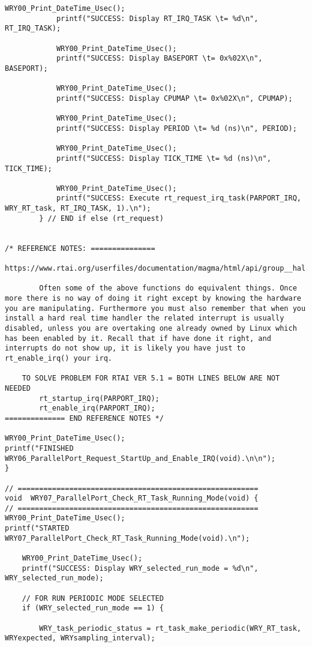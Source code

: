 \begin{lstlisting}[caption={App4-Full C-Code listing for Real Time (RTAI)}, label=App4-Full C-Code listing for Real Time (RTAI)]
			WRY00_Print_DateTime_Usec();
			printf("SUCCESS: Display RT_IRQ_TASK \t= %d\n", RT_IRQ_TASK);
			
			WRY00_Print_DateTime_Usec();
			printf("SUCCESS: Display BASEPORT \t= 0x%02X\n", BASEPORT);
			
			WRY00_Print_DateTime_Usec();
			printf("SUCCESS: Display CPUMAP \t= 0x%02X\n", CPUMAP);
			
			WRY00_Print_DateTime_Usec();
			printf("SUCCESS: Display PERIOD \t= %d (ns)\n", PERIOD);
			
			WRY00_Print_DateTime_Usec();
			printf("SUCCESS: Display TICK_TIME \t= %d (ns)\n", TICK_TIME);
			
			WRY00_Print_DateTime_Usec();
			printf("SUCCESS: Execute rt_request_irq_task(PARPORT_IRQ, WRY_RT_task, RT_IRQ_TASK, 1).\n");
		} // END if else (rt_request)			


/* REFERENCE NOTES: ===============
		https://www.rtai.org/userfiles/documentation/magma/html/api/group__hal.html#ga74
		
		Often some of the above functions do equivalent things. Once more there is no way of doing it right except by knowing the hardware you are manipulating. Furthermore you must also remember that when you install a hard real time handler the related interrupt is usually disabled, unless you are overtaking one already owned by Linux which has been enabled by it. Recall that if have done it right, and interrupts do not show up, it is likely you have just to rt_enable_irq() your irq. 
		
	TO SOLVE PROBLEM FOR RTAI VER 5.1 = BOTH LINES BELOW ARE NOT NEEDED
		rt_startup_irq(PARPORT_IRQ);
		rt_enable_irq(PARPORT_IRQ);
============== END REFERENCE NOTES */

WRY00_Print_DateTime_Usec(); 
printf("FINISHED WRY06_ParallelPort_Request_StartUp_and_Enable_IRQ(void).\n\n");
}

// ========================================================
void  WRY07_ParallelPort_Check_RT_Task_Running_Mode(void) {
// ========================================================
WRY00_Print_DateTime_Usec(); 
printf("STARTED  WRY07_ParallelPort_Check_RT_Task_Running_Mode(void).\n");

	WRY00_Print_DateTime_Usec();
	printf("SUCCESS: Display WRY_selected_run_mode = %d\n", WRY_selected_run_mode);

	// FOR RUN PERIODIC MODE SELECTED
	if (WRY_selected_run_mode == 1) {
	
		WRY_task_periodic_status = rt_task_make_periodic(WRY_RT_task, WRYexpected, WRYsampling_interval);
	

\end{lstlisting}
